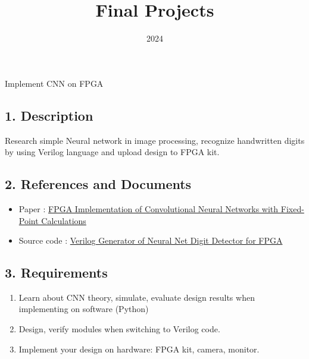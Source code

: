 \documentclass{vhdl-assignment}
\title{Final Projects}
\date{2024}
\begin{document}
\maketitle
\thispagestyle{fancy}

\begin{project}{Implement CNN on FPGA}
    \subsection*{1. Description}
    Research simple Neural network in image processing, recognize handwritten digits by using Verilog language and upload design to FPGA kit.
    \subsection*{2. References and Documents}
    \begin{itemize}
        \item Paper : \href{https://ieeexplore.ieee.org/document/8656778}{FPGA Implementation of Convolutional Neural Networks with Fixed-Point Calculations}
        \item Source code : \href{https://github.com/ZFTurbo/Verilog-Generator-of-Neural-Net-Digit-Detector-for-FPGA}{Verilog Generator of Neural Net Digit Detector for FPGA}
    \end{itemize}
    \subsection*{3. Requirements}
    \begin{enumerate}
        \item Learn about CNN theory, simulate, evaluate design results when implementing on software (Python)
        \item Design, verify modules when switching to Verilog code.
        \item Implement your design on hardware: FPGA kit, camera, monitor.
    \end{enumerate}
\end{project}
\end{document}
